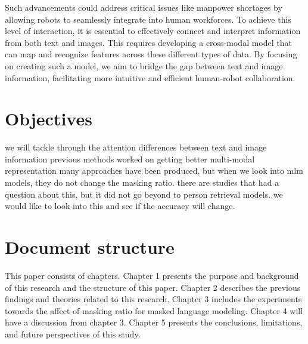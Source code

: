 Such advancements could address critical issues like manpower shortages by allowing robots to seamlessly integrate into human workforces. To achieve this level of interaction, it is essential to effectively connect and interpret information from both text and images. This requires developing a cross-modal model that can map and recognize features across these different types of data. By focusing on creating such a model, we aim to bridge the gap between text and image information, facilitating more intuitive and efficient human-robot collaboration.

\section{Objectives}
we will tackle through the attention differences between text and image information
previous methods worked on getting better multi-modal representation 
many approaches have been produced, but when we look into mlm models, they do not change the masking ratio. there are studies that had a question about this, but it did not go beyond to person retrieval models. we would like to look into this and see if the accuracy will change.

\section{Document structure}

This paper consists of chapters. Chapter 1 presents the purpose and background of this research and the structure of this paper. Chapter 2 describes the previous findings and theories related to this research. Chapter 3 includes the experiments towards the affect of masking ratio for masked language modeling. Chapter 4 will have a discussion from chapter 3. Chapter 5 presents the conclusions, limitations, and future perspectives of this study.
